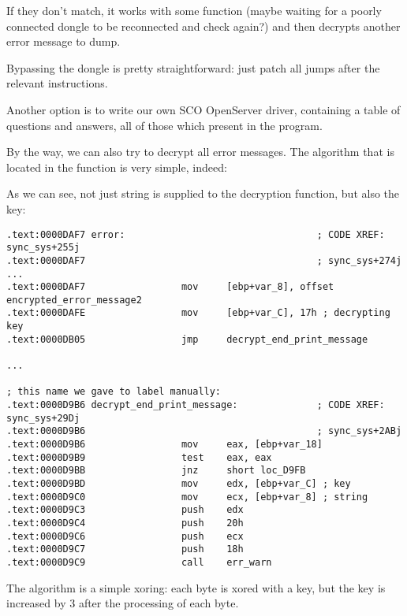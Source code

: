 If they don't match, it works with some  
function (maybe waiting for a poorly
connected dongle to be reconnected and check again?) and then decrypts another error message to dump.



Bypassing the dongle is pretty straightforward: just patch all jumps after the relevant \CMP instructions.


Another option is to write our own SCO OpenServer driver, containing a table of questions and answers, all of those which present in the program.


By the way, we can also 
try to decrypt all error messages.
The algorithm that is located in the  
function is very simple, indeed:



As we can see, 
not just string is supplied to the decryption function, but also the key:

\begin{lstlisting}
.text:0000DAF7 error:                                  ; CODE XREF: sync_sys+255j
.text:0000DAF7                                         ; sync_sys+274j ...
.text:0000DAF7                 mov     [ebp+var_8], offset encrypted_error_message2
.text:0000DAFE                 mov     [ebp+var_C], 17h ; decrypting key
.text:0000DB05                 jmp     decrypt_end_print_message

...

; this name we gave to label manually:
.text:0000D9B6 decrypt_end_print_message:              ; CODE XREF: sync_sys+29Dj
.text:0000D9B6                                         ; sync_sys+2ABj
.text:0000D9B6                 mov     eax, [ebp+var_18]
.text:0000D9B9                 test    eax, eax
.text:0000D9BB                 jnz     short loc_D9FB
.text:0000D9BD                 mov     edx, [ebp+var_C] ; key
.text:0000D9C0                 mov     ecx, [ebp+var_8] ; string
.text:0000D9C3                 push    edx
.text:0000D9C4                 push    20h
.text:0000D9C6                 push    ecx
.text:0000D9C7                 push    18h
.text:0000D9C9                 call    err_warn
\end{lstlisting}

The algorithm is a simple \gls{xoring}: 
each 
byte is xored with a key, but the key is increased by 3 after the processing of each byte.

